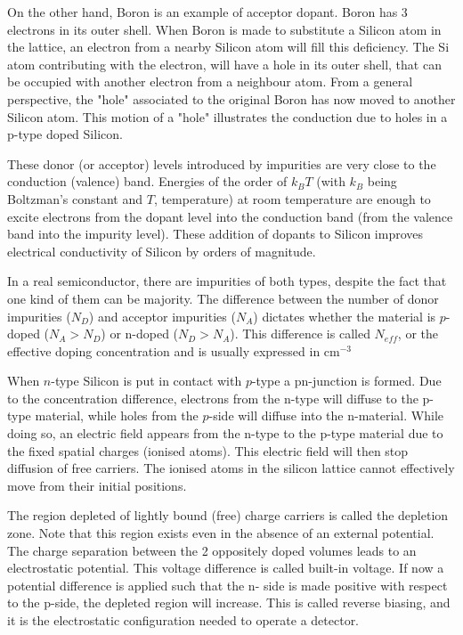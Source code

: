 On the other hand, Boron is an example of acceptor dopant. Boron has 3 electrons
in its outer shell. When Boron is made to substitute a Silicon atom in the
lattice, an electron from a nearby Silicon atom will fill this deficiency. The
Si atom contributing with the electron, will have a hole in its outer shell,
that can be occupied with another electron from a neighbour atom. From a general
perspective, the "hole" associated to the original Boron has now moved to
another Silicon atom. This motion of a "hole" illustrates the conduction due to
holes in a p-type doped Silicon.

These donor (or acceptor) levels introduced by impurities are very close to the
conduction (valence) band. Energies of the order of $k_B T$ (with $k_B$ being 
Boltzman's constant and $T$, temperature) at room temperature are enough to 
excite electrons from the dopant level into the conduction band (from the 
valence band into the impurity level). These addition of dopants to 
Silicon improves electrical conductivity of Silicon by orders of magnitude.  

In a real semiconductor, there are impurities of both types, despite the fact
that one kind of them can be majority. The difference between the number of
donor impurities ($N_D$) and acceptor impurities ($N_A$) dictates whether the
material is $p$-doped ($N_A > N_D $) or n-doped ($N_D > N_A$). This difference
is called $N_{eff}$, or the effective doping concentration and is usually 
expressed in cm$^{-3}$

When $n$-type Silicon is put in contact with $p$-type a pn-junction is formed.
Due to the concentration difference, electrons from the n-type will diffuse to
the p-type material, while holes from the $p$-side will diffuse into the
n-material. While doing so, an electric field appears from the n-type to the
p-type material due to the fixed spatial charges (ionised atoms). This electric
field will then stop diffusion of free carriers. The ionised atoms in the
silicon lattice cannot effectively move from their initial positions. 

The region depleted of lightly bound (free) charge carriers is called the  
depletion zone. Note that this region exists even in the absence of an 
external potential. The charge separation between the 2 oppositely doped 
volumes leads to an electrostatic potential. This voltage difference is called 
built-in voltage. If now a potential difference is applied such that the n-
side is made positive with respect to the p-side, the depleted region will 
increase. This is called reverse biasing, and it is the electrostatic 
configuration needed to  operate a detector. 

